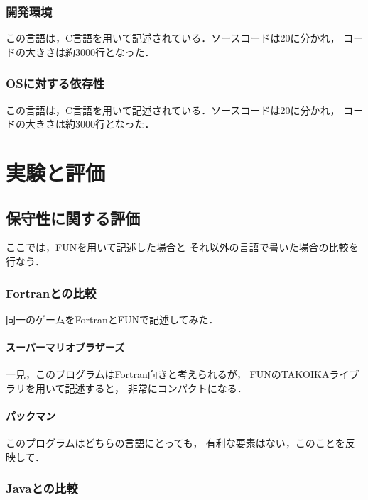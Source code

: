 \documentclass{funthesis}
\begin{document}
\subsection{開発環境}

この言語は，C言語を用いて記述されている．ソースコードは20に分かれ，
コードの大きさは約3000行となった．

\subsection{OSに対する依存性}

この言語は，C言語を用いて記述されている．ソースコードは20に分かれ，
コードの大きさは約3000行となった．


\chapter{実験と評価}

\section{保守性に関する評価}

ここでは，FUNを用いて記述した場合と
それ以外の言語で書いた場合の比較を行なう．

\subsection{Fortranとの比較}

同一のゲームをFortranとFUNで記述してみた．

\subsubsection{スーパーマリオブラザーズ}

一見，このプログラムはFortran向きと考えられるが，
FUNのTAKOIKAライブラリを用いて記述すると，
非常にコンパクトになる．

\subsubsection{パックマン}

このプログラムはどちらの言語にとっても，
有利な要素はない，このことを反映して．

\subsection{Javaとの比較}
\end{document}
